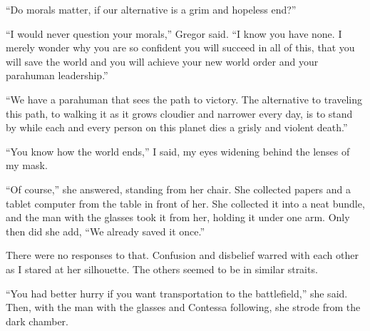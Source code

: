 ``Do morals matter, if our alternative is a grim and hopeless end?''



``I would never question your morals,'' Gregor said.  ``I know you have none.  I merely wonder why you are so confident you will succeed in all of this, that you will save the world and you will achieve your new world order and your parahuman leadership.''



``We have a parahuman that sees the path to victory.  The alternative to traveling this path, to walking it as it grows cloudier and narrower every day, is to stand by while each and every person on this planet dies a grisly and violent death.''



``You know how the world ends,'' I said, my eyes widening behind the lenses of my mask.



``Of course,'' she answered, standing from her chair.  She collected papers and a tablet computer from the table in front of her.  She collected it into a neat bundle, and the man with the glasses took it from her, holding it under one arm.  Only then did she add, ``We already saved it once.''



There were no responses to that.  Confusion and disbelief warred with each other as I stared at her silhouette.  The others seemed to be in similar straits.



``You had better hurry if you want transportation to the battlefield,'' she said.  Then, with the man with the glasses and Contessa following, she strode from the dark chamber.





